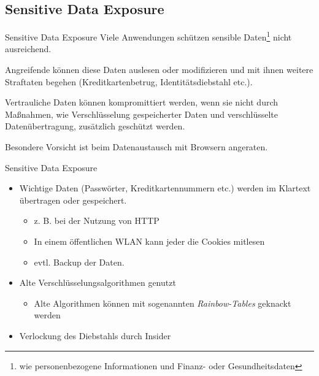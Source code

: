 \subsection{Sensitive Data Exposure}

\begin{defi}{Sensitive Data Exposure}
    Viele Anwendungen schützen sensible Daten\footnote{wie personenbezogene Informationen und Finanz- oder Gesundheitsdaten} nicht ausreichend.

    Angreifende können diese Daten auslesen oder modifizieren und mit ihnen weitere Straftaten begehen (Kreditkartenbetrug, Identitätsdiebstahl etc.).

    Vertrauliche Daten können kompromittiert werden, wenn sie nicht durch Maßnahmen, wie Verschlüsselung gespeicherter Daten und verschlüsselte Datenübertragung, zusätzlich geschützt werden.

    Besondere Vorsicht ist beim Datenaustausch mit Browsern angeraten.
\end{defi}

\begin{example}{Sensitive Data Exposure}
    \begin{itemize}
        \item Wichtige Daten (Passwörter, Kreditkartennummern etc.) werden im Klartext übertragen oder gespeichert.
              \begin{itemize}
                  \item z. B. bei der Nutzung von HTTP
                  \item In einem öffentlichen WLAN kann jeder die Cookies mitlesen
                  \item evtl. Backup der Daten.
              \end{itemize}
        \item Alte Verschlüsselungsalgorithmen genutzt
              \begin{itemize}
                  \item Alte Algorithmen können mit sogenannten \emph{Rainbow-Tables} geknackt werden
              \end{itemize}
        \item Verlockung des Diebstahls durch Insider
    \end{itemize}
\end{example}

